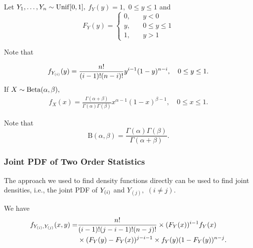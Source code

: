 \begin{eg}
Let $Y_1,\dots,Y_n\sim \operatorname*{Unif}[0,1],$ $f_Y(y)=1,$ $0\leq y\leq 1$ and 
$$
F_Y(y)=\begin{cases}
0, \quad &y<0 \\
y, \quad &0\leq y\leq 1 \\
1, \quad &y>1
\end{cases}
$$

Note that 

\begin{align*}
    f_{Y_{(i)}}(y)=\frac{n!}{(i-1)!(n-i)!}y^{i-1}(1-y)^{n-i}, \quad 0\leq y \leq 1.
\end{align*}
If $X\sim \operatorname*{Beta}(\alpha, \beta),$
\begin{align*}
  f_X(x)=\frac{\Gamma(\alpha + \beta)}{\Gamma(\alpha)\Gamma(\beta)}x^{\alpha-1}(1-x)^{\beta-1}, \quad 0\leq x \leq 1.  
\end{align*}
\end{eg}

Note that
$$
\text{B}(\alpha,\beta)=\frac{\Gamma(\alpha)\Gamma(\beta)}{\Gamma(\alpha+\beta)}.
$$
\subsubsection{Joint PDF of Two Order Statistics}
The approach we used to find density functions directly can be used to find joint densities, i.e., the joint PDF of ${Y_{(i)}}$ and $Y_{(j)},$ $(i\neq j).$


We have
\begin{align*}
f_{{{Y_{(i)}}}, Y_{(j)}}(x,y)
		=&\frac{n!}{(i-1)!(j-i-1)!(n-j)!}\times(F_Y(x))^{i-1}f_Y(x)\\
&\times(F_Y(y)-F_Y(x))^{j-i-1}\times f_Y(y)(1-F_Y(y))^{n-j}
.\end{align*}
